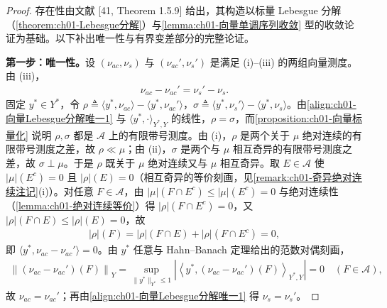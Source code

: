 \documentclass[../../main.tex]{subfiles}%
\begin{document}
\begin{proof}
存在性由文献 [41, Theorem 1.5.9] 给出，其构造以标量 Lebesgue 分解（\cref{theorem:ch01-Lebesgue分解}）与\cref{lemma:ch01-向量单调序列收敛} 型的收敛论证为基础。以下补出唯一性与有界变差部分的完整论证。

\textbf{第一步：唯一性。}设 $(\nu_{ac},\nu_s)$ 与 $(\nu_{ac}',\nu_s')$ 是满足 (i)--(iii) 的两组向量测度。由 (iii)，
\begin{align}
\nu_{ac}-\nu_{ac}'=\nu_s'-\nu_s. \label{align:ch01-向量Lebesgue分解唯一1}
\end{align}
固定 $y^*\in Y^*$，令 $\rho\triangleq\langle y^*,\nu_{ac}\rangle-\langle y^*,\nu_{ac}'\rangle$，$\sigma\triangleq\langle y^*,\nu_s'\rangle-\langle y^*,\nu_s\rangle$。由\eqref{align:ch01-向量Lebesgue分解唯一1} 与 $\langle y^*,\cdot\rangle_{Y^*,Y}$ 的线性，$\rho=\sigma$，而\cref{proposition:ch01-向量标量化} 说明 $\rho,\sigma$ 都是 $\mathcal{A}$ 上的有限带号测度。由 (i)，$\rho$ 是两个关于 $\mu$ 绝对连续的有限带号测度之差，故 $\rho\ll\mu$；由 (ii)，$\sigma$ 是两个与 $\mu$ 相互奇异的有限带号测度之差，故 $\sigma\perp\mu$。于是 $\rho$ 既关于 $\mu$ 绝对连续又与 $\mu$ 相互奇异。取 $E\in\mathcal{A}$ 使 $|\mu|(E^c)=0$ 且 $|\rho|(E)=0$（相互奇异的等价刻画，见\cref{remark:ch01-奇异绝对连续注记}(i)）。对任意 $F\in\mathcal{A}$，由 $|\mu|(F\cap E^c)\leqslant|\mu|(E^c)=0$ 与绝对连续性（\cref{lemma:ch01-绝对连续等价}）得 $|\rho|(F\cap E^c)=0$，又 $|\rho|(F\cap E)\leqslant|\rho|(E)=0$，故
\begin{align*}
|\rho|(F)=|\rho|(F\cap E)+|\rho|(F\cap E^c)=0,
\end{align*}
即 $\langle y^*,\nu_{ac}-\nu_{ac}'\rangle=0$。由 $y^*$ 任意与 Hahn--Banach 定理给出的范数对偶刻画，
\begin{align*}
\left\|(\nu_{ac}-\nu_{ac}')(F)\right\|_Y=\sup_{\|y^*\|_{Y^*}\leqslant1}\left|\left\langle y^*,(\nu_{ac}-\nu_{ac}')(F)\right\rangle_{Y^*,Y}\right|=0\quad(F\in\mathcal{A}),
\end{align*}
故 $\nu_{ac}=\nu_{ac}'$；再由\eqref{align:ch01-向量Lebesgue分解唯一1} 得 $\nu_s=\nu_s'$。


\end{proof}
\end{document}
